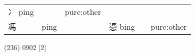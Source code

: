 \documentclass[14pt,a4paper]{scrartcl}
\begin{document}
\begin{longtable}[c]{@{}llllll@{}}
\begin{minipage}[t]{0.14\columnwidth}
冫 ping
\strut\end{minipage} &
\begin{minipage}[t]{0.14\columnwidth}\raggedright\strut
\strut\end{minipage} &
\begin{minipage}[t]{0.14\columnwidth}\raggedright\strut
pure:other
\strut\end{minipage}\tabularnewline
\begin{minipage}[t]{0.14\columnwidth}\raggedright\strut
馮
\strut\end{minipage} &
\begin{minipage}[t]{0.14\columnwidth}\raggedright\strut
ping
\strut\end{minipage} &
\begin{minipage}[t]{0.14\columnwidth}\raggedright\strut
\strut\end{minipage} &
\begin{minipage}[t]{0.14\columnwidth}\raggedright\strut
憑 bing
\strut\end{minipage} &
\begin{minipage}[t]{0.14\columnwidth}\raggedright\strut
\strut\end{minipage} &
\begin{minipage}[t]{0.14\columnwidth}\raggedright\strut
pure:other
\strut\end{minipage}\tabularnewline
\bottomrule
\end{longtable}

(236) 0902 {[}2{]}
\end{document}
